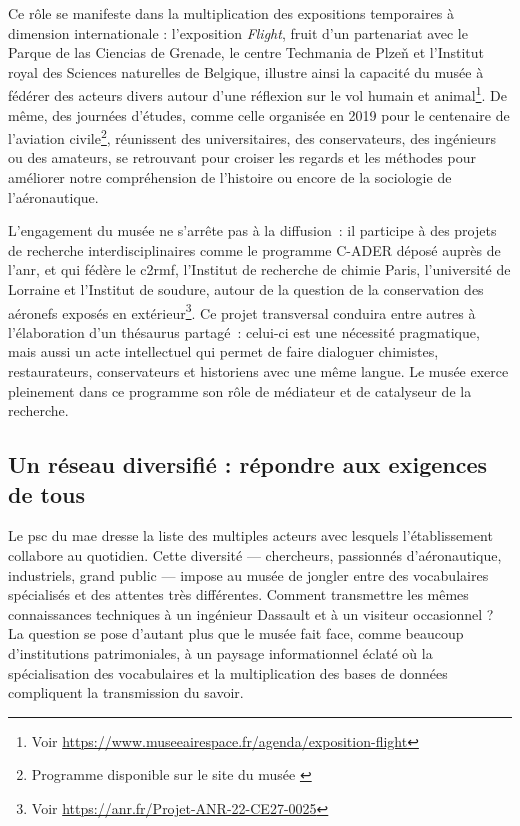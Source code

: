 Ce rôle se manifeste dans la multiplication des expositions temporaires à dimension internationale : l’exposition \emph{Flight}, fruit d’un partenariat avec le Parque de las Ciencias de Grenade, le centre Techmania de Plzeň et l’Institut royal des Sciences naturelles de Belgique, illustre ainsi la capacité du musée à fédérer des acteurs divers autour d’une réflexion sur le vol humain et animal\footnote{Voir \href{https://www.museeairespace.fr/agenda/exposition-flight}{https://www.museeairespace.fr/agenda/exposition-flight}}. De même, des journées d’études, comme celle organisée en 2019 pour le centenaire de l’aviation civile\footnote{Programme disponible sur le site du musée \cite{19192019CentAns}}, réunissent des universitaires, des conservateurs, des ingénieurs ou des amateurs, se retrouvant pour croiser les regards et les méthodes pour améliorer notre compréhension de l'histoire ou encore de la sociologie de l'aéronautique.

L’engagement du musée ne s’arrête pas à la diffusion : il participe à des projets de recherche interdisciplinaires comme le programme C-ADER déposé auprès de l'\ac{anr}, et qui fédère le \ac{c2rmf}, l’Institut de recherche de chimie Paris, l’université de Lorraine et l’Institut de soudure, autour de la  question de la conservation des aéronefs exposés en extérieur\footnote{Voir  \href{https://anr.fr/Projet-ANR-22-CE27-0025}{https://anr.fr/Projet-ANR-22-CE27-0025}}. Ce projet transversal conduira entre autres à l’élaboration d’un thésaurus partagé : celui-ci est une nécessité pragmatique, mais aussi un acte intellectuel qui permet de faire dialoguer chimistes, restaurateurs, conservateurs et historiens avec une même langue. Le musée exerce pleinement dans ce programme son rôle de médiateur et de catalyseur de la recherche.

\subsection{Un réseau diversifié : répondre aux exigences de tous}

Le \ac{psc} du \ac{mae} dresse la liste des multiples acteurs avec lesquels l'établissement collabore au quotidien. Cette diversité — chercheurs, passionnés d'aéronautique, industriels, grand public — impose au musée de jongler entre des vocabulaires spécialisés et des attentes très différentes. Comment transmettre les mêmes connaissances techniques à un ingénieur Dassault et à un visiteur occasionnel ? La question se pose d'autant plus que le musée fait face, comme beaucoup d'institutions patrimoniales, à un paysage informationnel éclaté où la spécialisation des vocabulaires et la multiplication des bases de données compliquent la transmission du savoir.

